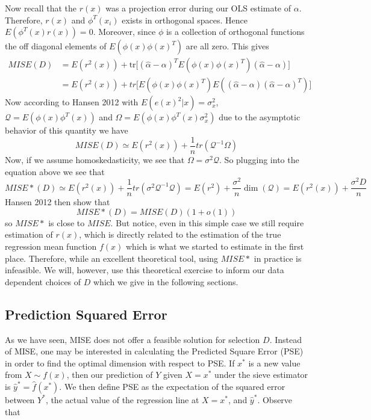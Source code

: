 \documentclass[12pt]{article}  %
\begin{document}
Now recall that the $r(x)$ was a projection error during our OLS estimate of $\alpha$. Therefore, $r(x)$ and $\phi^{T}(x_i)$ exists in orthogonal spaces. Hence $E(\phi^{T}(x)r(x)) = 0$. Moreover, since $\phi$ is a collection of orthogonal functions the off diagonal elements of $E(\phi(x)\phi(x)^T)$ are all zero. This gives 
\begin{align*}
MISE(D) &= E(r^{2}(x)) + \text{tr}\Big[(\hat{\alpha} - \alpha)^TE(\phi(x)\phi(x)^T)(\hat{\alpha} - \alpha)\Big]\\
&= E(r^{2}(x)) + tr\Big[E(\phi(x)\phi(x)^{T})E\left((\hat{\alpha} - \alpha)(\hat{\alpha} - \alpha)^{T}\right)\Big]
\end{align*}
Now according to Hansen 2012 with $E(e(x)^2|x) = \sigma_x^2$, $\mathcal{Q} = E(\phi(x)\phi^T(x))$ and $\Omega = E(\phi(x)\phi^T(x)\sigma_x^2)$ due to the asymptotic behavior of this quantity we have 
$$MISE(D)\simeq E(r^2(x)) + \frac{1}{n}tr\left(\mathcal{Q}^{-1}\Omega\right)$$
Now, if we assume homoskedasticity, we see that $\Omega = \sigma^2\mathcal{Q}$. So plugging into the equation above we see that 
$$MISE*(D)\simeq E(r^2(x)) + \frac{1}{n}tr\left(\sigma^2\mathcal{Q}^{-1}\mathcal{Q}\right) = E(r^2) + \frac{\sigma^2}{n}\dim(\mathcal{Q}) = E(r^2(x)) + \frac{\sigma^2 D}{n}$$
Hansen 2012 then show that $$MISE*(D) = MISE(D)(1 + o(1))$$ so $MISE*$ is close to $MISE$. But notice, even in this simple case we still require estimation of $r(x)$, which is directly related to the estimation of the true regression mean function $f(x)$ which is what we started to estimate in the first place. Therefore, while an excellent theoretical tool, using $MISE*$ in practice is infeasible. We will, however, use this theoretical exercise to inform our data dependent choices of $D$ which we give in the following sections.

\subsection{Prediction Squared Error}

As we have seen, MISE does not offer a feasible solution for selection $D$. Instead of MISE, one may be interested in calculating the Predicted Square Error (PSE) in order to find the optimal dimension with respect to PSE. If $x^*$  is a new value from $X \sim f(x)$, then our prediction of $Y$ given $X = x^*$ under the sieve estimator is $\hat{y}^* = \hat{f}(x^*)$. We then define PSE as the expectation of the squared error between $Y^*$, the actual value of the regression line at $X=x^*$, and $\hat{y}^*$. Observe that
\end{document}
